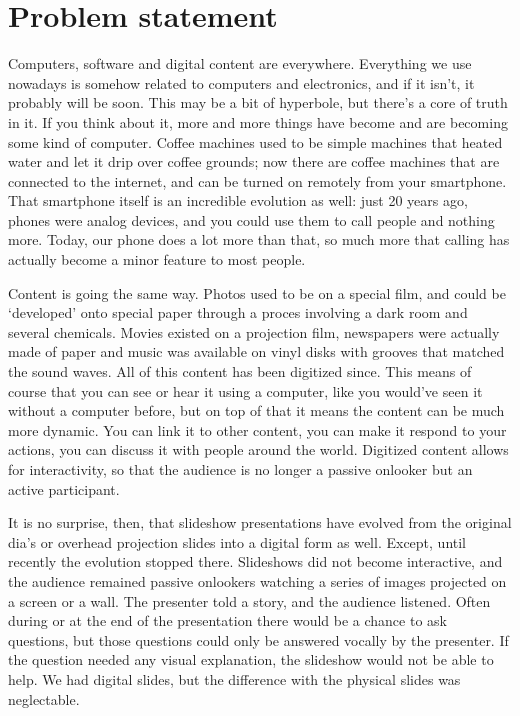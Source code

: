 
 \chapter{Problem statement}

  Computers, software and digital content are everywhere. Everything we use
  nowadays is somehow related to computers and electronics, and if it isn't, it
  probably will be soon. This may be a bit of hyperbole, but there's a core of
  truth in it. If you think about it, more and more things have become and are
  becoming some kind of computer. Coffee machines used to be simple machines
  that heated water and let it drip over coffee grounds; now there are coffee
  machines that are connected to the internet, and can be turned on remotely
  from your smartphone. That smartphone itself is an incredible evolution as
  well: just 20 years ago, phones were analog devices, and you could use them
  to call people and nothing more. Today, our phone does a lot more than that,
  so much more that calling has actually become a minor feature to most people.

  Content is going the same way. Photos used to be on a special film, and could
  be `developed' onto special paper through a proces involving a dark room and
  several chemicals. Movies existed on a projection film, newspapers were
  actually made of paper and music was available on vinyl disks with grooves
  that matched the sound waves. All of this content has been digitized since.
  This means of course that you can see or hear it using a computer, like you
  would've seen it without a computer before, but on top of that it means the
  content can be much more dynamic. You can link it to other content, you can
  make it respond to your actions, you can discuss it with people around the
  world. Digitized content allows for interactivity, so that the audience is no
  longer a passive onlooker but an active participant.

  It is no surprise, then, that slideshow presentations have evolved from the
  original dia's or overhead projection slides into a digital form as well.
  Except, until recently the evolution stopped there. Slideshows did not become
  interactive, and the audience remained passive onlookers watching a series of
  images projected on a screen or a wall. The presenter told a story, and the
  audience listened. Often during or at the end of the presentation there would
  be a chance to ask questions, but those questions could only be answered
  vocally by the presenter. If the question needed any visual explanation, the
  slideshow would not be able to help. We had digital slides, but the
  difference with the physical slides was neglectable.

